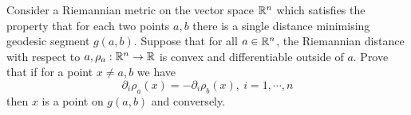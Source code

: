 Consider a Riemannian metric on the vector space ${\Bbb{R}^n}$ which satisfies the property that for each two points ${a,b}$ there is a single distance minimising geodesic segment ${g(a,b)}$. Suppose that for all ${a \in \Bbb{R}^n}$, the Riemannian distance with respect to ${a}, {\rho_a : \Bbb{R}^n \rightarrow \Bbb{R}}$ is convex and differentiable outside of ${a}$. Prove that if for a point ${x \neq a,b}$ we have
\[ \displaystyle \partial_i \rho_a(x)=-\partial_i \rho_b(x),\ i=1,\cdots, n\]
then ${x}$ is a point on ${g(a,b)}$ and conversely.

